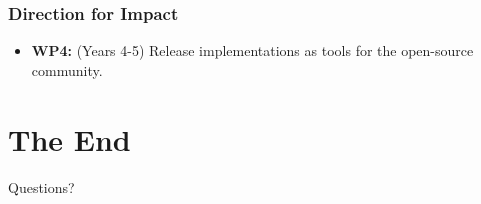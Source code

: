 \documentclass{beamer}
\begin{document}

\begin{frame}
\frametitle{Direction for Impact}
\begin{itemize}
\item\textbf{WP4:} (Years 4-5) Release implementations as tools for the open-source community.
\end{itemize}
\end{frame}

\section{The End}

\begin{frame}
\Huge{\centerline{Questions?}}
\end{frame}

\end{document}
